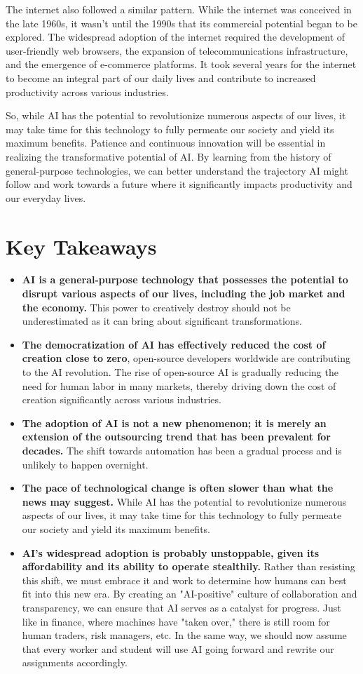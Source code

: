 The internet also followed a similar pattern. While the internet was conceived in the late 1960s, it wasn't until the 1990s that its commercial potential began to be explored. The widespread adoption of the internet required the development of user-friendly web browsers, the expansion of telecommunications infrastructure, and the emergence of e-commerce platforms. It took several years for the internet to become an integral part of our daily lives and contribute to increased productivity across various industries.

So, while AI has the potential to revolutionize numerous aspects of our lives, it may take time for this technology to fully permeate our society and yield its maximum benefits. Patience and continuous innovation will be essential in realizing the transformative potential of AI. By learning from the history of general-purpose technologies, we can better understand the trajectory AI might follow and work towards a future where it significantly impacts productivity and our everyday lives.

\section{Key Takeaways}

\begin{itemize}
\item \textbf{AI is a general-purpose technology that possesses the potential to disrupt various aspects of our lives, including the job market and the economy.} This power to creatively destroy should not be underestimated as it can bring about significant transformations.
\item \textbf{The democratization of AI has effectively reduced the cost of creation close to zero}, open-source developers worldwide are contributing to the AI revolution. The rise of open-source AI is gradually reducing the need for human labor in many markets, thereby driving down the cost of creation significantly across various industries.
\item \textbf{The adoption of AI is not a new phenomenon; it is merely an extension of the outsourcing trend that has been prevalent for decades.} The shift towards automation has been a gradual process and is unlikely to happen overnight.
\item \textbf{The pace of technological change is often slower than what the news may suggest.} While AI has the potential to revolutionize numerous aspects of our lives, it may take time for this technology to fully permeate our society and yield its maximum benefits.
\item \textbf{AI's widespread adoption is probably unstoppable, given its affordability and its ability to operate stealthily.} Rather than resisting this shift, we must embrace it and work to determine how humans can best fit into this new era. By creating an "AI-positive" culture of collaboration and transparency, we can ensure that AI serves as a catalyst for progress. Just like in finance, where machines have "taken over," there is still room for human traders, risk managers, etc. In the same way, we should now assume that every worker and student will use AI going forward and rewrite our assignments accordingly.
\end{itemize}
